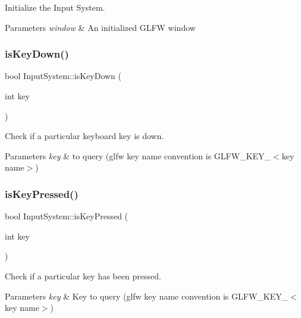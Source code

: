 Initialize the Input System. 


\begin{DoxyParams}{Parameters}
{\em window} & An initialized G\+L\+FW window \\
\hline
\end{DoxyParams}
\mbox{\label{class_input_system_aa7758990eeeebe5a42fc79116ee60983}} 
\subsubsection{\texorpdfstring{isKeyDown()}{isKeyDown()}}
{\footnotesize\ttfamily bool Input\+System\+::is\+Key\+Down (\begin{DoxyParamCaption}\item[{int}]{key }\end{DoxyParamCaption})}



Check if a particular keyboard key is down. 


\begin{DoxyParams}{Parameters}
{\em key} & to query (glfw key name convention is G\+L\+F\+W\+\_\+\+K\+E\+Y\+\_\+$<$key name$>$) \\
\hline
\end{DoxyParams}
\mbox{\label{class_input_system_a1518b44c6d45b3fb9a03e9fdad59eb67}} 
\subsubsection{\texorpdfstring{isKeyPressed()}{isKeyPressed()}}
{\footnotesize\ttfamily bool Input\+System\+::is\+Key\+Pressed (\begin{DoxyParamCaption}\item[{int}]{key }\end{DoxyParamCaption})}



Check if a particular key has been pressed. 


\begin{DoxyParams}{Parameters}
{\em key} & Key to query (glfw key name convention is G\+L\+F\+W\+\_\+\+K\+E\+Y\+\_\+$<$key name$>$) \\
\hline
\end{DoxyParams}
\mbox{\label{class_input_system_aa5958921b6cd8d711a3c49b358ec8e90}} 
